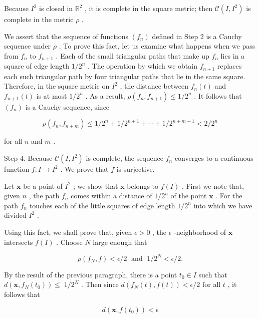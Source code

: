 \documentclass[10pt]{article}
\begin{document}
Because \({I}^{2}\) is closed in \({\mathbb{R}}^{2}\) , it is complete in the square metric; then \(\mathcal{C}\left( {I,{I}^{2}}\right)\) is complete in the metric \(\rho\) .

We assert that the sequence of functions \(\left( {f}_{n}\right)\) defined in Step 2 is a Cauchy sequence under \(\rho\) . To prove this fact, let us examine what happens when we pass from \({f}_{n}\) to \({f}_{n + 1}\) . Each of the small triangular paths that make up \({f}_{n}\) lies in a square of edge length \(1/{2}^{n}\) . The operation by which we obtain \({f}_{n + 1}\) replaces each such triangular path by four triangular paths that lie in the same square. Therefore, in the square metric on \({I}^{2}\) , the distance between \({f}_{n}\left( t\right)\) and \({f}_{n + 1}\left( t\right)\) is at most \(1/{2}^{n}\) . As a result, \(\rho \left( {{f}_{n},{f}_{n + 1}}\right)  \leq  1/{2}^{n}\) . It follows that \(\left( {f}_{n}\right)\) is a Cauchy sequence, since

\[
\rho \left( {{f}_{n},{f}_{n + m}}\right)  \leq  1/{2}^{n} + 1/{2}^{n + 1} + \cdots  + 1/{2}^{n + m - 1} < 2/{2}^{n}
\]

for all \(n\) and \(m\) .

Step 4. Because \(\mathcal{C}\left( {I,{I}^{2}}\right)\) is complete, the sequence \({f}_{n}\) converges to a continuous function \(f : I \rightarrow  {I}^{2}\) . We prove that \(f\) is surjective.

Let \(\mathbf{x}\) be a point of \({I}^{2}\) ; we show that \(\mathbf{x}\) belongs to \(f\left( I\right)\) . First we note that, given \(n\) , the path \({f}_{n}\) comes within a distance of \(1/{2}^{n}\) of the point \(\mathbf{x}\) . For the path \({f}_{n}\) touches each of the little squares of edge length \(1/{2}^{n}\) into which we have divided \({I}^{2}\) .

Using this fact, we shall prove that, given \(\epsilon  > 0\) , the \(\epsilon\) -neighborhood of \(\mathbf{x}\) intersects \(f\left( I\right)\) . Choose \(N\) large enough that

\[
\rho \left( {{f}_{N},f}\right)  < \epsilon /2\;\text{ and }\;1/{2}^{N} < \epsilon /2.
\]

By the result of the previous paragraph, there is a point \({t}_{0} \in  I\) such that \(d\left( {\mathbf{x},{f}_{N}\left( {t}_{0}\right) }\right)  \leq \; 1/{2}^{N}\) . Then since \(d\left( {{f}_{N}\left( t\right) ,f\left( t\right) }\right)  < \epsilon /2\) for all \(t\) , it follows that

\[
d\left( {\mathbf{x},f\left( {t}_{0}\right) }\right)  < \epsilon
\]
\end{document}
